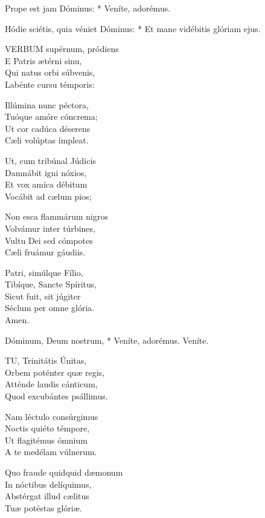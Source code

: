  Prope est jam Dóminus: * Veníte, adorémus.


 Hódie sciétis, quia véniet Dóminus: * Et mane vidébitis glóriam ejus.


\lettrine[lines=2]{V}{ERBUM} supérnum, pródiens\\
E Patris ætérni sinu,\\
Qui natus orbi súbvenis,\\
Labénte cursu témporis:

Illúmina nunc péctora,\\
Tuóque amóre cóncrema;\\
Ut cor cadúca déserens\\
Cæli volúptas ímpleat.

Ut, cum tribúnal Júdicis\\
Damnábit igni nóxios,\\
Et vox amíca débitum\\
Vocábit ad cælum pios;

Non esca flammárum nigros\\
Volvámur inter túrbines,\\
Vultu Dei sed cómpotes\\
Cæli fruámur gáudiis.

Patri, simúlque Fílio,\\
Tibíque, Sancte Spíritus,\\
Sicut fuit, sit júgiter\\
Séclum per omne glória.\\
Amen.


 Dóminum, Deum nostrum, * Veníte, adorémus.  Veníte.


\lettrine[lines=2]{T}{U}, Trinitátis Únitas,\\
Orbem poténter quæ regis,\\
Atténde laudis cánticum,\\
Quod excubántes psállimus.

Nam léctulo consúrgimus\\
Noctis quiéto témpore,\\
Ut flagitémus ómnium\\
A te medélam vúlnerum.

Quo fraude quidquid dæmonum\\
In nóctibus delíquimus,\\
Abstérgat illud cælitus\\
Tuæ potéstas glóriæ.

